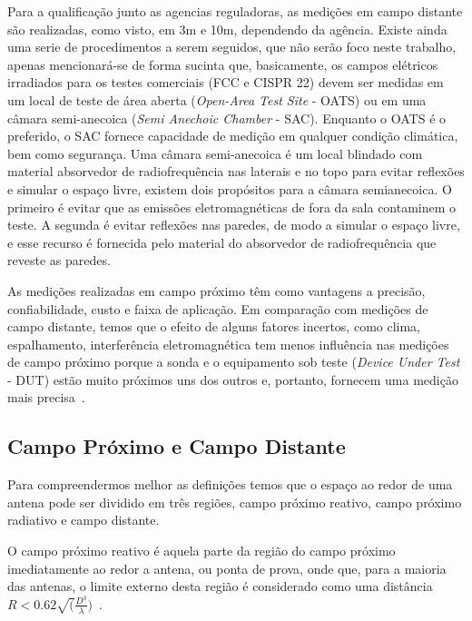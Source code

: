 Para a qualificação junto as agencias reguladoras, as medições em campo distante são realizadas, como visto, em 3m e 10m, dependendo da agência. Existe ainda uma serie de procedimentos a serem seguidos, que não serão foco neste trabalho, apenas mencionará-se de forma sucinta que, basicamente, os campos elétricos irradiados para os testes comerciais (FCC e CISPR 22) devem ser medidas em um local de teste de área aberta (\textit{Open-Area Test Site} - OATS) ou em uma câmara semi-anecoica (\textit{Semi Anechoic Chamber} - SAC). Enquanto o OATS é o preferido, o SAC fornece
capacidade de medição em qualquer condição climática, bem como segurança. Uma câmara semi-anecoica é um local blindado com material absorvedor de radiofrequência nas laterais e no topo para evitar reflexões e simular o espaço livre, existem dois propósitos para a câmara semianecoica. O primeiro é evitar que as emissões eletromagnéticas de fora da sala contaminem o teste. A segunda é evitar reflexões nas paredes, de modo a simular o espaço livre, e esse recurso é fornecida pelo material do absorvedor de radiofrequência que reveste as paredes.

As medições realizadas em campo próximo têm como vantagens a precisão, confiabilidade, custo e faixa de aplicação. Em comparação com medições de campo distante, temos que o efeito de alguns fatores incertos, como clima, espalhamento, interferência eletromagnética tem menos influência nas medições de campo próximo porque a sonda e o equipamento sob teste (\textit{Device Under Test} - DUT) estão muito próximos uns dos outros e, portanto, fornecem uma medição mais precisa~\cite{sivaraman2017}.


\subsection{Campo Próximo e Campo Distante}
Para compreendermos melhor as definições temos que o espaço ao redor de uma antena pode ser dividido em três regiões, campo próximo reativo, campo próximo radiativo e campo distante. 

O campo próximo reativo é aquela parte da região do campo próximo imediatamente ao redor
a antena, ou ponta de prova, onde que, para a maioria das antenas, o limite externo desta região é considerado como uma distância $R < 0.62 \sqrt(\frac{D^3}{\lambda})$~\cite[p.~34]{balanis2005}.

